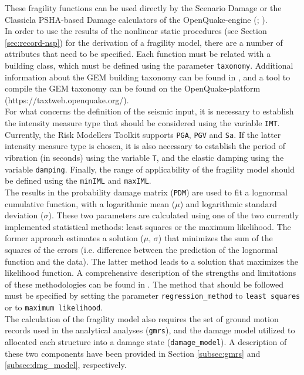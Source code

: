 These fragility functions can be used directly by the Scenario Damage or the Classicla PSHA-based Damage calculators of the OpenQuake-engine (\cite{SilvaEtAl2014a}; \cite{PaganiEtAl2014a}). \\

In order to use the results of the nonlinear static procedures (see Section \ref{sec:record-nsp}) for the derivation of a fragility model, there are a number of attributes that need to be specified. Each function must be related with a building class, which must be defined using the parameter \verb=taxonomy=. Additional information about the GEM building taxonomy can be found in \cite{BrzevEtAl2013}, and a tool to compile the GEM taxonomy can be found on the OpenQuake-platform (https://taxtweb.openquake.org/).\\

For what concerns the definition of the seismic input, it is necessary to establish the intensity measure type that should be considered using the variable \verb=IMT=. Currently, the Risk Modellers Toolkit supports \verb=PGA=, \verb=PGV= and \verb=Sa=. If the latter intensity measure type is chosen, it is also necessary to establish the period of vibration (in seconds) using the variable \verb=T=, and the elastic damping using the variable \verb=damping=. Finally, the range of applicability of the fragility model should be defined using the \verb=minIML= and \verb=maxIML=.  \\

The results in the probability damage matrix (\verb=PDM=) are used to fit a lognormal cumulative function, with a logarithmic mean ($\mu$) and logarithmic standard deviation ($\sigma$). These two parameters are calculated using one of the two currently implemented statistical methods: least squares or the maximum likelihood. The former approach estimates a solution ($\mu$, $\sigma$) that minimizes the sum of the squares of the errors (i.e. difference between the prediction of the lognormal function and the data). The latter method leads to a solution that maximizes the likelihood function. A comprehensive description of the strengths and limitations of these methodologies can be found in \cite{LallemantEtAl2015}. The method that should be followed must be specified by setting the parameter \verb=regression_method= to \verb=least squares= or to \verb=maximum likelihood=.\\

The calculation of the fragility model also requires the set of ground motion records used in the analytical analyses (\verb=gmrs=), and the damage model utilized to allocated each structure into a damage state (\verb=damage_model=). A description of these two components have been provided in Section \ref{subsec:gmrs} and \ref{subsec:dmg_model}, respectively.\\

